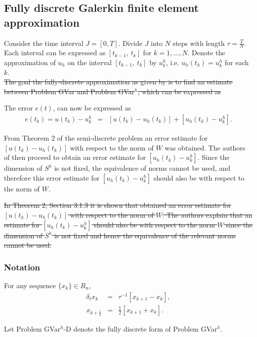 \documentclass[../../main.tex]{subfiles}
\begin{document}
\subsection{Fully discrete Galerkin finite element approximation}
Consider the time interval $J = [0,T]$. Divide $J$ into $N$ steps with length $\tau = \frac{T}{N}$. Each interval can be expressed as $[t_{k-1}, \ t_k]$ for $k = 1,...,N$. Denote the approximation of $u_h$ on the interval $[t_{k-1}, \ t_k]$ by $u_k^h$, i.e. $u_h(t_k) = u_k^h$ for each $k$.\\


\sout{The goal the fully-discrete approximation as given by \cite{BV13} is to find an estimate between Problem GVar and Problem GVar$^h$, which can be expressed as}

The error $e(t)$, can now be expressed as
\begin{eqnarray}
	e(t_k) = u(t_k) - u^h_k & = & [u(t_k)-u_h(t_k)] + [u_h(t_k) - u^h_k]. \label{error_e}
\end{eqnarray}


From Theorem 2 of the semi-discrete problem an error estimate for $[u(t_k)-u_h(t_k)]$ with respect to the norm of $W$ was obtained. The authors of \cite{BV13} then proceed to obtain an error estimate for $[u_h(t_k) - u^h_k]$. Since the dimension of $S^h$ is not fixed, the equivalence of norms cannot be used, and therefore this error estimate for $[u_h(t_k) - u^h_k]$ should also be with respect to the norm of $W$.

\sout{In Theorem 2, Section 3.1.3 it is shown that \cite{BV13} obtained an error estimate for $[u(t_k)-u_h(t_k)]$ with respect to the norm of $W$. The authors explain that an estimate for $[u_h(t_k) - u^h_k]$ should also be with respect to the norm $W$ since the dimension of $S^h$ is not fixed and hence the equivalence of the relevant norms cannot be used.}\\

\subsubsection{Notation}
For any sequence $\{x_k\} \in R_n$,
\begin{eqnarray*}
	\delta_{t}x_{k}& = &\tau^{-1}[x_{k+1}-x_{k}],\\
	x_{k+\frac{1}{2}} & = & \frac{1}{2}[x_{k+1}+x_{k}].
\end{eqnarray*}

Let Problem GVar$^h$-D denote the fully discrete form of Problem GVar$^h$.
\end{document}
